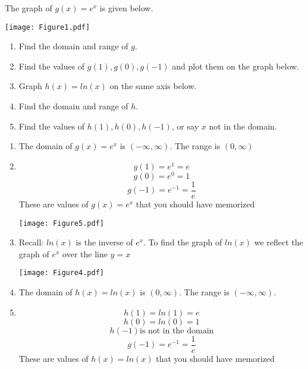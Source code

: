 \documentclass[noinstructornotes]{ximera}
\begin{document}
\begin{instructorNotes}

\end{instructorNotes}




\begin{problem}
The graph of $g(x)=e^x$ is given below.

	\begin{image}		
	\texttt{[image: Figure1.pdf]}
	\end{image}

\begin{enumerate}	
	\item  Find the domain and range of $g$.
	
	\item  Find the values of $g(1), g(0), g(-1)$ and plot them on the graph below.

	\item Graph $h(x)=ln(x)$ on the same axis below.

	\item Find the domain and range of $h$.

	\item Find the values of $h(1), h(0), h(-1)$, or say $x$ not in the domain.
	
	\end{enumerate}
	


	\begin{freeResponse}
		\begin{enumerate}
		
		\item 
			The domain of $g(x)=e^x$ is $(-\infty,\infty)$.  The range is $(0,\infty)$
		
		\item  
			$$g(1)=e^1=e$$
			$$ g(0)=e^0=1$$ 
			$$g(-1)=e^{-1}=\frac{1}{e}$$
			 These are values of $g(x)=e^x$ that you should have memorized

	\begin{image}		
	\texttt{[image: Figure5.pdf]}
	\end{image}



		\item Recall:  $ln(x)$ is the inverse of $e^x$.  To find the graph of $ln(x)$ we reflect the graph of $e^x$ over the line $y=x$

	\begin{image}		
	\texttt{[image: Figure4.pdf]}
	\end{image}

 		\item The domain of $h(x)=ln(x)$ is $(0,\infty)$.  The range is $(-\infty,\infty)$.

		\item $$h(1)=ln(1)=e$$
			$$ h(0)=ln(0)=1$$
			$$ h(-1) \text{is not in the domain}$$
			$$g(-1)=e^{-1}=\frac{1}{e}$$
			 These are values of $h(x)=ln(x)$ that you should have memorized
		
		\end{enumerate}
	\end{freeResponse}
	
\end{problem}
\end{document}
